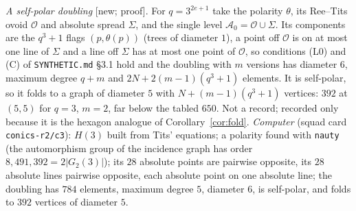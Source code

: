 \documentclass[11pt]{amsart}
\theoremstyle{definition}
\theoremstyle{remark}
\newcommand{\cO}{\mathcal{O}}
\newcommand{\status}[1]{\textup{[#1]}}
\begin{document}
\emph{A self-polar doubling} \status{new; proof}. For $q=3^{2e+1}$ take the polarity $\theta$, its Ree--Tits ovoid $\cO$
and absolute spread $\Sigma$, and the single level $\mathcal A_0=\cO\cup\Sigma$. Its components are the $q^3+1$ flags
$(p,\theta(p))$ (trees of diameter $1$), a point off $\cO$ is on at most one line of $\Sigma$ and a line off $\Sigma$
has at most one point of $\cO$, so conditions (L0) and (C) of \texttt{SYNTHETIC.md} \S3.1 hold and the doubling with $m$
versions has diameter $6$, maximum degree $q+m$ and $2N+2(m-1)(q^3+1)$ elements. It is self-polar, so it folds to a
graph of diameter $5$ with $N+(m-1)(q^3+1)$ vertices: $392$ at $(5,5)$ for $q=3$, $m=2$, far below the tabled $650$.
Not a record; recorded only because it is the hexagon analogue of Corollary~\ref{cor:fold}. \emph{Computer} (squad card
\texttt{conics-r2/c3}): $H(3)$ built from Tits' equations; a polarity found with \texttt{nauty} (the automorphism group
of the incidence graph has order $8{,}491{,}392=2|G_2(3)|$); its $28$ absolute points are pairwise opposite, its $28$
absolute lines pairwise opposite, each absolute point on one absolute line; the doubling has $784$ elements, maximum
degree $5$, diameter $6$, is self-polar, and folds to $392$ vertices of diameter $5$.
\end{document}
